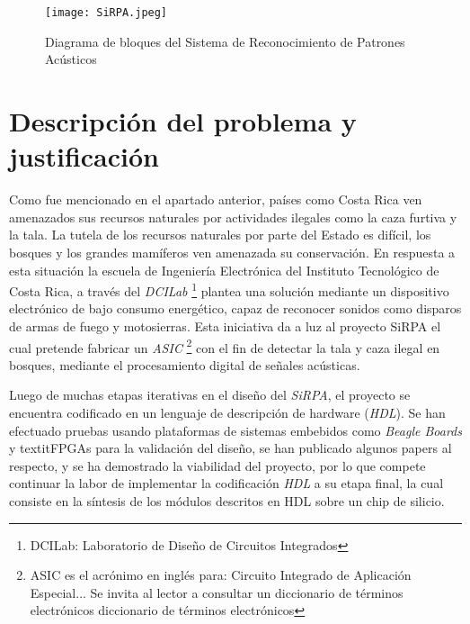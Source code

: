 \begin{figure}[h]
\texttt{[image: SiRPA.jpeg]}
\centering
\caption{Diagrama de bloques del Sistema de Reconocimiento de Patrones Acústicos \cite{Carlosthesis}}
\label{sirpa}
\end{figure}


\section{Descripción del problema y justificación}

Como fue mencionado en el apartado anterior, países como Costa Rica ven amenazados sus recursos naturales por actividades ilegales como la caza furtiva y la tala. La tutela de los recursos naturales por parte del Estado es difícil, los bosques y los grandes mamíferos ven amenazada su conservación. En respuesta a esta situación la escuela de Ingeniería Electrónica del Instituto Tecnológico de Costa Rica, a través del \textit{DCILab} \footnote{DCILab: Laboratorio de Diseño de Circuitos Integrados} plantea una solución mediante un dispositivo electrónico de bajo consumo energético, capaz de reconocer sonidos como disparos de armas de fuego y motosierras. Esta iniciativa da a luz al proyecto SiRPA el cual pretende fabricar un \textit{ASIC} \footnote{ASIC es el acrónimo en inglés para: Circuito Integrado de Aplicación Especial... Se invita al lector a consultar un diccionario de términos electrónicos diccionario de términos electrónicos} con el fin de detectar la tala y caza ilegal en bosques, mediante el procesamiento digital de señales acústicas.

Luego de muchas etapas iterativas en el diseño del \textit{SiRPA}, el proyecto se encuentra codificado en un lenguaje de descripción de hardware (\textit{HDL}). Se han efectuado pruebas usando plataformas de sistemas embebidos como \textit{Beagle Boards} y textit{FPGAs}  para la validación del diseño, se han publicado algunos papers al respecto, y se ha demostrado la viabilidad del proyecto, por lo que compete continuar la labor de
implementar la codificación \textit{HDL} a su etapa final, la cual consiste en la síntesis de los módulos
descritos en HDL sobre un chip de silicio.

